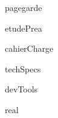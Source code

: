 \documentclass[a4paper, 12pt, titlepage, oneside, french]{article}
\begin{document}
{pagegarde}
\newpage

\tableofcontents
\newpage

{etudePrea}
\newpage

{cahierCharge}
\newpage

{techSpecs}
\newpage

{devTools}
\newpage

{real}
\newpage

\printbibliography
\end{document}
